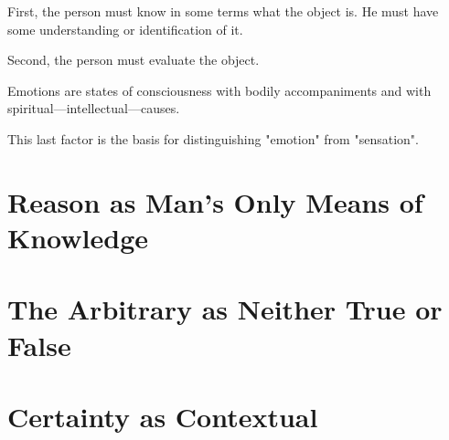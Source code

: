         First, the person must know in some terms what the object is. He must have some understanding or identification of it.
        
        Second, the person must evaluate the object.
        
        Emotions are states of consciousness with bodily accompaniments and with spiritual—intellectual—causes.
        
        This last factor is the basis for distinguishing "emotion" from "sensation".

    \section{Reason as Man's Only Means of Knowledge}

    \section{The Arbitrary as Neither True or False}

    \section{Certainty as Contextual}